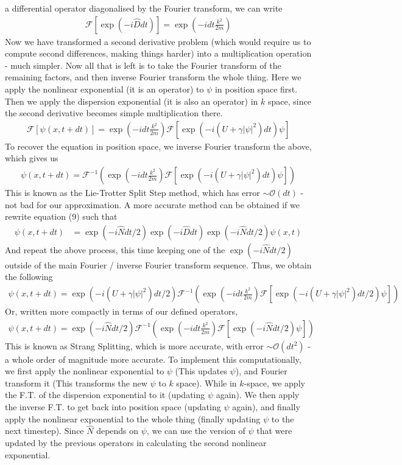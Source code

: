 \documentclass{article}
\begin{document}
a differential operator diagonalised by the Fourier transform, we can write
\begin{align}
    \mathcal{F}[\exp(-i\hat{D}dt)]=\exp(-idt\frac{k^2}{2m})
\end{align}
Now we have transformed a second derivative problem (which would require us to compute 
second differences, making things harder) into a multiplication operation - much simpler. 
Now all that is left is to take the Fourier transform of the remaining factors, 
and then inverse 
Fourier transform the whole thing. Here we apply the nonlinear exponential (it is an operator) to 
$\psi$ in position space first. Then we apply the dispersion exponential (it is also an operator) in 
$k$ space, since the second derivative becomes simple multiplication there. 
\begin{align}
    \mathcal{F}[\psi(x,t+dt)]=\exp(-idt\frac{k^2}{2m})\mathcal{F}[\exp(-i(U+\gamma|\psi|^2)dt)\psi]
\end{align}
To recover the equation in position space, we inverse Fourier transform the above, which gives us 
\begin{align}
    \psi(x,t+dt)=\mathcal{F}^{-1}(\exp(-idt\frac{k^2}{2m})\mathcal{F}[\exp(-i(U+\gamma|\psi|^2)dt)\psi])
\end{align}
This is known as the Lie-Trotter Split Step method, which has error $\sim \mathcal{O}(dt)$ - not bad for our approximation. A more accurate method can be obtained if we 
rewrite equation (9) such that 
\begin{align}
    \psi(x,t+dt)&=\exp(-i\hat{N}dt/2)\exp(-i\hat{D}dt)\exp(-i\hat{N}dt/2)\psi(x,t)
\end{align} 
And repeat the above process, this time keeping one of the $\exp(-i\hat{N}dt/2)$ outside of 
the main Fourier / inverse Fourier transform sequence. Thus, we obtain the following 
\begin{align}
    \psi(x,t+dt)=\exp(-i(U+\gamma|\psi|^2)dt/2)\mathcal{F}^{-1}(\exp(-idt\frac{k^2}{2m})\mathcal{F}[\exp(-i(U+\gamma|\psi|^2)dt/2)\psi])    
\end{align}
Or, written more compactly in terms of our defined operators, 
\begin{align}
    \psi(x,t+dt)=\exp(-i\hat{N}dt/2)\mathcal{F}^{-1}(\exp(-idt\frac{k^2}{2m})\mathcal{F}[\exp(-i\hat{N}dt/2)\psi])
\end{align}
This is known as Strang Splitting, which is more accurate, with error $\sim \mathcal{O}(dt^2)$ - a whole 
order of magnitude more accurate. To implement this computationally, we first 
apply the nonlinear exponential 
to $\psi$ (This updates $\psi$), and Fourier transform it (This transforms the new $\psi$ to $k$ space).  While in $k$-space, we apply the F.T.
of the dispersion exponential to it (updating $\psi$ again). We then apply the inverse F.T.
to get back into position space (updating $\psi$ again), and
 finally apply the nonlinear exponential to the whole thing (finally updating $\psi$ to the next timestep). 
Since $\hat{N}$ depends on $\psi$, we can use the version of $\psi$ 
that were updated by the previous operators in calculating the second nonlinear exponential.
\newpage
\end{document}
